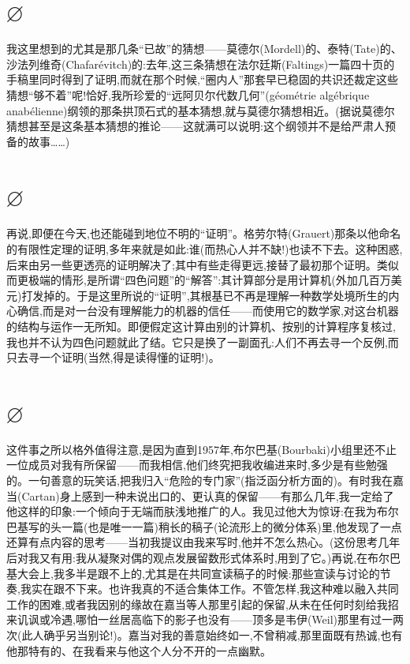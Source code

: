 \section{$\varnothing$}

我这里想到的尤其是那几条“已故”的猜想——莫德尔(Mordell)的、泰特(Tate)的、沙法列维奇(Chafarévitch)的:去年,这三条猜想在法尔廷斯(Faltings)一篇四十页的手稿里同时得到了证明,而就在那个时候,“圈内人”那套早已稳固的共识还裁定这些猜想“够不着”呢!恰好,我所珍爱的“远阿贝尔代数几何”(géométrie algébrique anabélienne)纲领的那条拱顶石式的基本猜想,就与莫德尔猜想相近。(据说莫德尔猜想甚至是这条基本猜想的推论——这就满可以说明:这个纲领并不是给严肃人预备的故事……)

\section{$\varnothing$}

再说,即便在今天,也还能碰到地位不明的“证明”。格劳尔特(Grauert)那条以他命名的有限性定理的证明,多年来就是如此:谁(而热心人并不缺!)也读不下去。这种困惑,后来由另一些更透亮的证明解决了;其中有些走得更远,接替了最初那个证明。类似而更极端的情形,是所谓“四色问题”的“解答”:其计算部分是用计算机(外加几百万美元)打发掉的。于是这里所说的“证明”,其根基已不再是理解一种数学处境所生的内心确信,而是对一台没有理解能力的机器的信任——而使用它的数学家,对这台机器的结构与运作一无所知。即便假定这计算由别的计算机、按别的计算程序复核过,我也并不认为四色问题就此了结。它只是换了一副面孔:人们不再去寻一个反例,而只去寻一个证明(当然,得是读得懂的证明!)。

\section{$\varnothing$}

这件事之所以格外值得注意,是因为直到1957年,布尔巴基(Bourbaki)小组里还不止一位成员对我有所保留——而我相信,他们终究把我收编进来时,多少是有些勉强的。一句善意的玩笑话,把我归入“危险的专门家”(指泛函分析方面的)。有时我在嘉当(Cartan)身上感到一种未说出口的、更认真的保留——有那么几年,我一定给了他这样的印象:一个倾向于无端而肤浅地推广的人。我见过他大为惊讶:在我为布尔巴基写的头一篇(也是唯一一篇)稍长的稿子(论流形上的微分体系)里,他发现了一点还算有点内容的思考——当初我提议由我来写时,他并不怎么热心。(这份思考几年后对我又有用:我从凝聚对偶的观点发展留数形式体系时,用到了它。)再说,在布尔巴基大会上,我多半是跟不上的,尤其是在共同宣读稿子的时候:那些宣读与讨论的节奏,我实在跟不下来。也许我真的不适合集体工作。不管怎样,我这种难以融入共同工作的困难,或者我因别的缘故在嘉当等人那里引起的保留,从未在任何时刻给我招来讥讽或冷遇,哪怕一丝居高临下的影子也没有——顶多是韦伊(Weil)那里有过一两次(此人确乎另当别论!)。嘉当对我的善意始终如一,不曾稍减,那里面既有热诚,也有他那特有的、在我看来与他这个人分不开的一点幽默。

